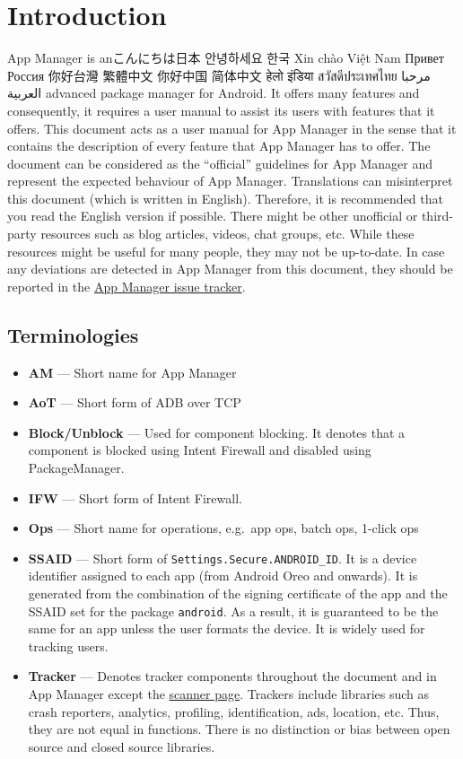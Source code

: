 \chapter{Introduction}\label{ch:introduction}

App Manager is anこんにちは日本 안녕하세요 한국  Xin chào Việt Nam Привет Россия 你好台灣 繁體中文 你好中国 简体中文 हेलो इंडिया สวัสดีประเทศไทย مرحبا العربية  advanced package manager for Android. It offers many features and consequently, it requires a user
manual to assist its users with features that it offers. This document acts as a user manual for App Manager in the
sense that it contains the description of every feature that App Manager has to offer. The document can be considered as
the ``official'' guidelines for App Manager and represent the expected behaviour of App Manager. Translations can
misinterpret this document (which is written in English). Therefore, it is recommended that you read the English version
if possible. There might be other unofficial or third-party resources such as blog articles, videos, chat groups, etc.
While these resources might be useful for many people, they may not be up-to-date. In case any deviations are detected
in App Manager from this document, they should be reported in the
\href{https://github.com/MuntashirAkon/AppManager/issues}{App Manager issue tracker}.


\section{Terminologies}\label{sec:terminologies}
\begin{itemize}
    \item \textbf{AM} --- Short name for App Manager
    \item \textbf{AoT} --- Short form of ADB over TCP
    \item \textbf{Block/Unblock} --- Used for component blocking. It denotes that a component is blocked using Intent
    Firewall and disabled using PackageManager.
    \item \textbf{IFW} --- Short form of Intent Firewall.
    \item \textbf{Ops} --- Short name for operations, e.g.\ app ops, batch ops, 1-click ops
    \item \textbf{SSAID} --- Short form of \texttt{Settings.Secure.ANDROID\_ID}. It is a device identifier assigned to
    each app (from Android Oreo and onwards). It is generated from the combination of the signing certificate of the app
    and the SSAID set for the package \texttt{android}. As a result, it is guaranteed to be the same for an app unless
    the user formats the device. It is widely used for tracking users.
    \item \textbf{Tracker} --- Denotes tracker components throughout the document and in App Manager except the
    \hyperref[sec:scanner-page]{scanner page}. Trackers include libraries such as crash reporters, analytics,
    profiling, identification, ads, location, etc. Thus, they are not equal in functions. There is no distinction or
    bias between open source and closed source libraries.
\end{itemize}

